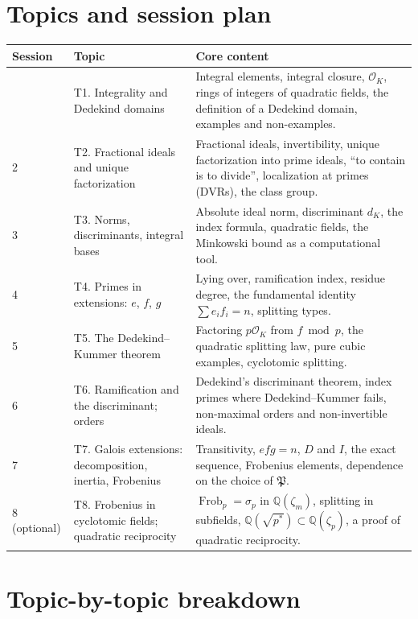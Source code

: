 \documentclass[11pt]{article}
\newcommand{\Q}{\mathbb{Q}}
\newcommand{\OK}{\mathcal{O}_K}
\newcommand{\fP}{\mathfrak{P}}
\DeclareMathOperator{\Frob}{Frob}
\begin{document}
\section{Topics and session plan}

\begin{longtable}{@{}p{}p{}p{}@{}}
\toprule
\textbf{Session} & \textbf{Topic} & \textbf{Core content}\\
\midrule
\endhead
\bottomrule
\endfoot
1 & T1. Integrality and Dedekind domains & Integral elements, integral closure, $\OK$, rings of integers of quadratic fields, the definition of a Dedekind domain, examples and non-examples.\\
2 & T2. Fractional ideals and unique factorization & Fractional ideals, invertibility, unique factorization into prime ideals, ``to contain is to divide'', localization at primes (DVRs), the class group.\\
3 & T3. Norms, discriminants, integral bases & Absolute ideal norm, discriminant $d_K$, the index formula, quadratic fields, the Minkowski bound as a computational tool.\\
4 & T4. Primes in extensions: $e$, $f$, $g$ & Lying over, ramification index, residue degree, the fundamental identity $\sum e_if_i=n$, splitting types.\\
5 & T5. The Dedekind--Kummer theorem & Factoring $p\OK$ from $f\bmod p$, the quadratic splitting law, pure cubic examples, cyclotomic splitting.\\
6 & T6. Ramification and the discriminant; orders & Dedekind's discriminant theorem, index primes where Dedekind--Kummer fails, non-maximal orders and non-invertible ideals.\\
7 & T7. Galois extensions: decomposition, inertia, Frobenius & Transitivity, $efg=n$, $D$ and $I$, the exact sequence, Frobenius elements, dependence on the choice of $\fP$.\\
8 (optional) & T8. Frobenius in cyclotomic fields; quadratic reciprocity & $\Frob_p=\sigma_p$ in $\Q(\zeta_m)$, splitting in subfields, $\Q(\sqrt{p^*})\subset\Q(\zeta_p)$, a proof of quadratic reciprocity.\\
\end{longtable}

\section{Topic-by-topic breakdown}
\end{document}
